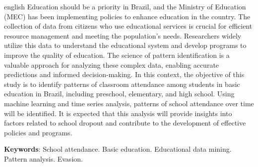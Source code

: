 
\begin{resumo}[Abstract]
 \begin{otherlanguage*}{english}
Education should be a priority in Brazil, and the Ministry of Education (MEC) has been implementing policies to enhance education in the country. The collection of data from citizens who use educational services is crucial for efficient resource management and meeting the population's needs. Researchers widely utilize this data to understand the educational system and develop programs to improve the quality of education. The science of pattern identification is a valuable approach for analyzing these complex data, enabling accurate predictions and informed decision-making. In this context, the objective of this study is to identify patterns of classroom attendance among students in basic education in Brazil, including preschool, elementary, and high school. Using machine learning and time series analysis, patterns of school attendance over time will be identified. It is expected that this analysis will provide insights into factors related to school dropout and contribute to the development of effective policies and programs.


   \textbf{Keywords}: School attendance. Basic education. Educational data mining. Pattern analysis. Evasion.
 \end{otherlanguage*}
\end{resumo}
